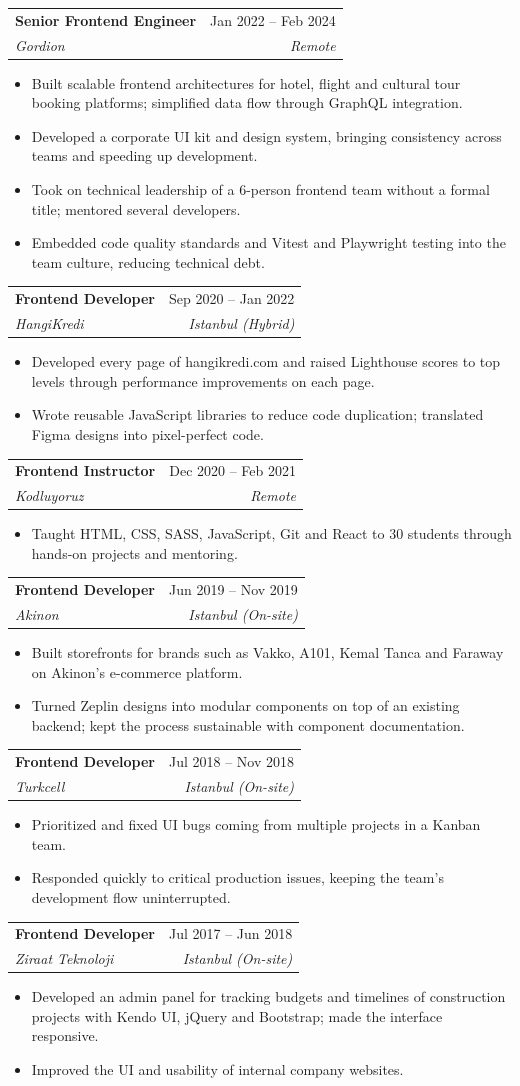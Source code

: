 \documentclass[a4paper,11pt]{article}
\makeatletter
\newcommand{\resumeItem}[1]{
  \item\small{
    {#1 \vspace{-2pt}}
  }
}
\newcommand{\resumeSubheading}[4]{
  \vspace{-2pt}\item
    \begin{tabular*}{0.97\textwidth}[t]{l@{\extracolsep{\fill}}r}
      \textbf{#1} & \small #2 \\
      \textit{\small#3} & \textit{\small #4} \\
    \end{tabular*}\vspace{-7pt}
}
\newcommand{\resumeItemListStart}{\begin{itemize}}
\newcommand{\resumeItemListEnd}{\end{itemize}\vspace{3pt}}
\makeatother
\begin{document}
    \resumeSubheading
      {Senior Frontend Engineer}{Jan 2022 -- Feb 2024}
      {Gordion}{Remote}
      \resumeItemListStart
        \resumeItem{Built scalable frontend architectures for hotel, flight and cultural tour booking platforms; simplified data flow through GraphQL integration.}
        \resumeItem{Developed a corporate UI kit and design system, bringing consistency across teams and speeding up development.}
        \resumeItem{Took on technical leadership of a 6-person frontend team without a formal title; mentored several developers.}
        \resumeItem{Embedded code quality standards and Vitest and Playwright testing into the team culture, reducing technical debt.}
      \resumeItemListEnd

    \resumeSubheading
      {Frontend Developer}{Sep 2020 -- Jan 2022}
      {HangiKredi}{Istanbul (Hybrid)}
      \resumeItemListStart
        \resumeItem{Developed every page of hangikredi.com and raised Lighthouse scores to top levels through performance improvements on each page.}
        \resumeItem{Wrote reusable JavaScript libraries to reduce code duplication; translated Figma designs into pixel-perfect code.}
      \resumeItemListEnd

    \resumeSubheading
      {Frontend Instructor}{Dec 2020 -- Feb 2021}
      {Kodluyoruz}{Remote}
      \resumeItemListStart
        \resumeItem{Taught HTML, CSS, SASS, JavaScript, Git and React to 30 students through hands-on projects and mentoring.}
      \resumeItemListEnd

    \resumeSubheading
      {Frontend Developer}{Jun 2019 -- Nov 2019}
      {Akinon}{Istanbul (On-site)}
      \resumeItemListStart
        \resumeItem{Built storefronts for brands such as Vakko, A101, Kemal Tanca and Faraway on Akinon's e-commerce platform.}
        \resumeItem{Turned Zeplin designs into modular components on top of an existing backend; kept the process sustainable with component documentation.}
      \resumeItemListEnd

    \resumeSubheading
      {Frontend Developer}{Jul 2018 -- Nov 2018}
      {Turkcell}{Istanbul (On-site)}
      \resumeItemListStart
        \resumeItem{Prioritized and fixed UI bugs coming from multiple projects in a Kanban team.}
        \resumeItem{Responded quickly to critical production issues, keeping the team's development flow uninterrupted.}
      \resumeItemListEnd

    \resumeSubheading
      {Frontend Developer}{Jul 2017 -- Jun 2018}
      {Ziraat Teknoloji}{Istanbul (On-site)}
      \resumeItemListStart
        \resumeItem{Developed an admin panel for tracking budgets and timelines of construction projects with Kendo UI, jQuery and Bootstrap; made the interface responsive.}
        \resumeItem{Improved the UI and usability of internal company websites.}
      \resumeItemListEnd
\end{document}
